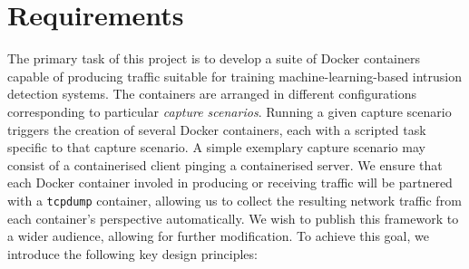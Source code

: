 \documentclass[sigconf,anonymous]{acmart}\usepackage[]{graphicx}\usepackage[]{color}
\begin{document}
\section{Requirements}
\label{sec:require}

The primary task of this project is to develop a suite of Docker containers capable of producing traffic suitable for training machine-learning-based intrusion detection systems. The containers are arranged in different configurations corresponding to particular \textit{capture scenarios}. Running a given capture scenario triggers the creation of several Docker containers, each with a scripted task specific to that capture scenario. A simple exemplary capture scenario may consist of a containerised client pinging a containerised server. We ensure that each Docker container involed in producing or receiving traffic will be partnered with a \texttt{tcpdump} container, allowing us to collect the resulting network traffic from each container's perspective automatically. We wish to publish this framework to a wider audience, allowing for further modification. To achieve this goal, we introduce the following key design principles:
\end{document}
